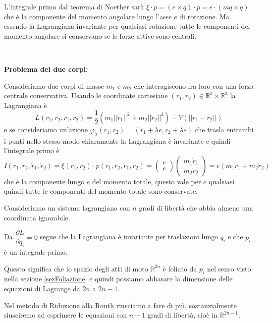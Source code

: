 \documentclass[11pt,a4paper,twoside]{book}
\newenvironment{esempio}[1][Esempio]{ 
  \begin{center}\begin{tcolorbox}[
  title={#1:\\},
  width=0.9\linewidth,
  flush right,
  enhanced jigsaw, 
  colback=white, 
  frame hidden, 
  sharpish corners, arc=3mm,
  borderline west = {1pt}{0pt}{gray},
  borderline south = {1pt}{0pt}{gray},
  coltitle=black, 
  fonttitle=\small\bfseries, 
  attach title to upper, 
  breakable,
  top=2.5pt, bottom=0.3pt]\small
  }{
 \normalsize \end{tcolorbox}\end{center}
}
\theoremstyle{esss}
\theoremstyle{dotless}
\numberwithin{equation}{section} %
\begin{document}
\begin{esempio}[Punto materiale non vincolato soggetto a forze attive conservative]
L'integrale primo dal teorema di Noether sarà $\xi\cdot p=(e\times q)\cdot p=e\cdot(mq\times \dot{q})$ che è la componente del momento angolare lungo l'asse $e$ di rotazione. 
Ma essendo la Lagrangiana invariante per qualsiasi rotazione tutte le componenti del momento angolare si conservano se le forze attive sono centrali. 
\par ~\par\noindent
\textbf{Problema dei due corpi:}\par\indent
Consideriamo due corpi di masse $m_1$ e $m_2$ che interagiscono fra loro con una forza centrale conservativa. Usando le coordinate cartesiane $(r_1,r_2)\in\mathbb{R}^3\times\mathbb{R}^3$ la Lagrangiana è
\[
L(r_1,r_2,\dot{r}_1,\dot{r}_2)=\dfrac{1}{2}\left( m_1||\dot{r}_1||^2 + m_2 ||\dot{r}_2||^2 \right) - V(||r_1-r_2||)
\]
e se consideriamo un'azione $\varphi_\lambda(r_1,r_2)=(r_1+\lambda e,r_2+ \lambda e)$ che trasla entrambi i punti nello stesso modo chiaramente la Lagrangiana è invariante e quindi l'integrale primo è
\[
I(r_1,r_2,\dot{r}_1,\dot{r}_2)=\xi(r_1,r_2)\cdot p(r_1,r_2,\dot{r}_1,\dot{r}_2) = \left(\begin{array}{c} e\\e \end{array}\right)\left(\begin{array}{c}
m_1\dot{r}_1 \\ m_2\dot{r}_2 \end{array}\right) = e \left( m_1\dot{r}_1 + m_2\dot{r}_2\right)
\]
che è la componente lungo $e$ del momento totale, questo vale per $e$ qualsiasi quindi tutte le componenti del momento totale sono conservate.
\end{esempio}







Consideriamo un sistema lagrangiano con $n$ gradi di libertà che abbia almeno una coordinata ignorabile.

Da $\dfrac{\partial L}{\partial q_i}=0$ segue che la Lagrangiana è invariante per traslazioni lungo $q_i$ e che $p_i$ è un integrale primo.

Questo significa che lo spazio degli atti di moto $\mathbb{R}^{2n}$ è foliato da $p_i$ nel senso visto nella sezione \ref{sezFoliazione} e quindi possiamo abbasare la dimensione delle equazioni di Lagrange da $2n$ a $2n-1$.

Nel metodo di Riduzione alla Routh riusciamo a fare di più, sostanzialmente riusciremo ad esprimere le equazioni con $n-1$ gradi di libertà, cioè in $\mathbb{R}^{2n-1}$.
\end{document}
